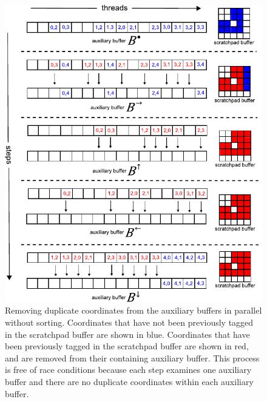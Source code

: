\begin{figure}[t]
\centering
\includegraphics[width=6.0in]{figures/RemoveDuplicates-Alt.pdf}
\caption{Removing duplicate coordinates from the auxiliary buffers in parallel without sorting. Coordinates that have not been previously tagged in the scratchpad buffer are shown in blue. Coordinates that have been previously tagged in the scratchpad buffer are shown in red, and are removed from their containing auxiliary buffer. This process is free of race conditions because each step examines one auxiliary buffer and there are no duplicate coordinates within each auxiliary buffer.}
\label{fig:4}
\end{figure}


